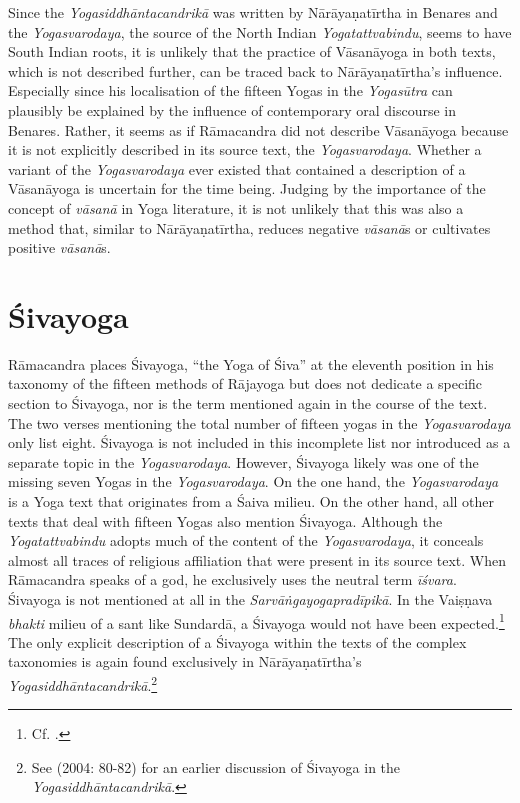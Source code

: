 Since the \emph{Yogasiddhāntacandrikā} was written by Nārāyaṇatīrtha in Benares and the \emph{Yogasvarodaya}, the source of the North Indian \emph{Yogatattvabindu}, seems to have South Indian roots, it is unlikely that the practice of Vāsanāyoga in both texts, which is not described further, can be traced back to Nārāyaṇatīrtha's influence. Especially since his localisation of the fifteen Yogas in the \emph{Yogasūtra} can plausibly be explained by the influence of contemporary oral discourse in Benares. Rather, it seems as if Rāmacandra did not describe Vāsanāyoga because it is not explicitly described in its source text, the \emph{Yogasvarodaya}. Whether a variant of the \emph{Yogasvarodaya} ever existed that contained a description of a Vāsanāyoga is uncertain for the time being. Judging by the importance of the concept of \textit{vāsanā} in Yoga literature, it is not unlikely that this was also a method that, similar to Nārāyaṇatīrtha, reduces negative \textit{vāsanā}s or cultivates positive \textit{vāsanā}s.

\section{Śivayoga}
\label{sivayogaintro}

Rāmacandra places Śivayoga, ``the Yoga of Śiva'' at the eleventh position in his taxonomy of the fifteen methods of Rājayoga but does not dedicate a specific section to Śivayoga, nor is the term mentioned again in the course of the text. The two verses mentioning the total number of fifteen yogas in the \textit{Yogasvarodaya} only list eight. Śivayoga is not included in this incomplete list nor introduced as a separate topic in the \textit{Yogasvarodaya}. However, Śivayoga likely was one of the missing seven Yogas in the \textit{Yogasvarodaya}. On the one hand, the \textit{Yogasvarodaya} is a Yoga text that originates from a Śaiva milieu. On the other hand, all other texts that deal with fifteen Yogas also mention Śivayoga. Although the \textit{Yogatattvabindu} adopts much of the content of the \textit{Yogasvarodaya}, it conceals almost all traces of religious affiliation that were present in its source text. When Rāmacandra speaks of a god, he exclusively uses the neutral term \textit{īśvara}. Śivayoga is not mentioned at all in the \textit{Sarvāṅgayogapradīpikā}. In the Vaiṣṇava \textit{bhakti} milieu of a sant like Sundardā, a Śivayoga would not have been expected.\footnote{Cf. \citeauthor[2023: 7]{horstmann2023shrine}.} The only explicit description of a Śivayoga within the texts of the complex taxonomies is again found exclusively in Nārāyaṇatīrtha's \textit{Yogasiddhāntacandrikā}.\footnote{See \citeauthor{penna2004} (2004: 80-82) for an earlier discussion of Śivayoga in the \textit{Yogasiddhāntacandrikā}.}

